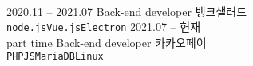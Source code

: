 \documentclass[9pt]{developercv.cls} %
\begin{document}
    \vspace{0.5cm}



    \begin{minipage}[t]{0.4\textwidth} %
        \vspace{-\baselineskip} %

        \whoami\\ %
    \end{minipage}
    \hfill %
    \begin{minipage}[t]{0.5\textwidth} %
        \vspace{-\baselineskip} %
        \begin{barchart}{5.5}
        \end{barchart}
    \end{minipage}

    \begin{center}
    \end{center}



    \begin{entrylist}
        \entry
        {2020.11 -- 2021.07}
        {Back-end developer}
        {뱅크샐러드}
        {\lorem \lorem \lorem\\ \texttt{node.js}\slashsep\texttt{Vue.js}\slashsep\texttt{Electron}}
        \entry
        {2021.07 -- 현재\\\footnotesize{part time}}
        {Back-end developer}
        {카카오페이}
        {\lorem\lorem\\ \texttt{PHP}\slashsep\texttt{JS}\slashsep\texttt{MariaDB}\slashsep\texttt{Linux}}
    \end{entrylist}
\end{document}
